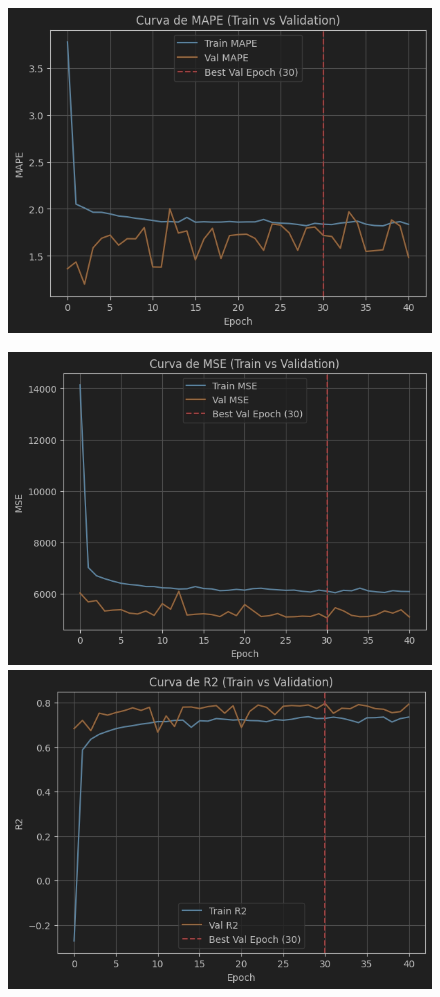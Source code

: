 \begin{figure}[H]
\begin{minipage}{0.48\textwidth}
		\includegraphics[width=\linewidth]{includes/cap5/graphs/sid1_trafficformer_mape.png}
	\end{minipage}
	\hfill
	\begin{minipage}{0.48\textwidth}
		\centering
		\includegraphics[width=\linewidth]{includes/cap5/graphs/sid1_trafficformer_mse.png}
		\vspace{0.2cm}
		\includegraphics[width=\linewidth]{includes/cap5/graphs/sid1_trafficformer_r2.png}

\end{minipage}
\end{figure}
